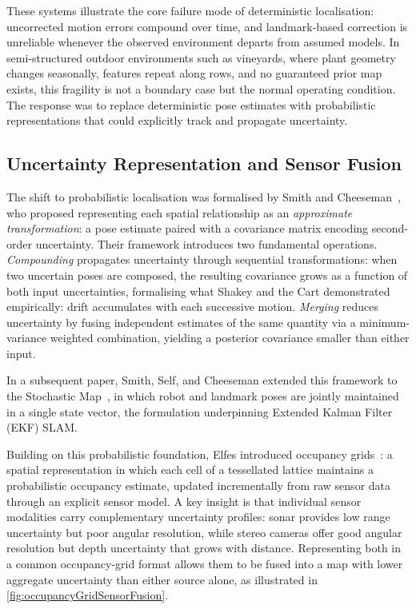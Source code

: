 These systems illustrate the core failure mode of deterministic localisation: uncorrected motion errors compound over time, and landmark-based correction is unreliable whenever the observed environment departs from assumed models. In semi-structured outdoor environments such as vineyards, where plant geometry changes seasonally, features repeat along rows, and no guaranteed prior map exists, this fragility is not a boundary case but the normal operating condition. The response was to replace deterministic pose estimates with probabilistic representations that could explicitly track and propagate uncertainty.

\subsection{Uncertainty Representation and Sensor Fusion}
\label{subsec:uncertainty-sensor-fusion}

The shift to probabilistic localisation was formalised by Smith and Cheeseman~\cite{smithRepresentationEstimationSpatial1987}, who proposed representing each spatial relationship as an \textit{approximate transformation}: a pose estimate paired with a covariance matrix encoding second-order uncertainty. Their framework introduces two fundamental operations. \textit{Compounding} propagates uncertainty through sequential transformations: when two uncertain poses are composed, the resulting covariance grows as a function of both input uncertainties, formalising what Shakey and the Cart demonstrated empirically: drift accumulates with each successive motion. \textit{Merging} reduces uncertainty by fusing independent estimates of the same quantity via a minimum-variance weighted combination, yielding a posterior covariance smaller than either input.

In a subsequent paper, Smith, Self, and Cheeseman extended this framework to the Stochastic Map~\cite{smithEstimatingUncertainSpatial2013}, in which robot and landmark poses are jointly maintained in a single state vector, the formulation underpinning Extended Kalman Filter (EKF) SLAM.

Building on this probabilistic foundation, Elfes introduced occupancy grids~\cite{elfesUsingOccupancyGrids1989}: a spatial representation in which each cell of a tessellated lattice maintains a probabilistic occupancy estimate, updated incrementally from raw sensor data through an explicit sensor model. A key insight is that individual sensor modalities carry complementary uncertainty profiles: sonar provides low range uncertainty but poor angular resolution, while stereo cameras offer good angular resolution but depth uncertainty that grows with distance. Representing both in a common occupancy-grid format allows them to be fused into a map with lower aggregate uncertainty than either source alone, as illustrated in \cref{fig:occupancyGridSensorFusion}.

